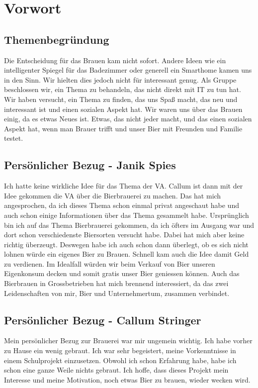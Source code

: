 \newpage
\section{Vorwort}
\subsection{Themenbegründung}
Die Entscheidung für das Brauen kam nicht sofort. Andere Ideen
 wie ein intelligenter Spiegel für das Badezimmer oder generell 
 ein Smarthome kamen uns in den Sinn. Wir hielten dies jedoch nicht
  für interessant genug. Als Gruppe beschlossen wir, ein Thema zu behandeln, das nicht direkt mit IT zu tun hat. Wir haben versucht, 
   ein Thema zu finden, das uns Spaß macht, das neu und interessant ist und einen sozialen Aspekt hat.
Wir waren uns über das Brauen einig,
 da es etwas Neues ist. Etwas, das nicht jeder macht, 
 und das einen sozialen Aspekt hat, wenn man Brauer trifft und unser Bier mit Freunden und Familie testet.
 \subsection{Persönlicher Bezug - Janik Spies}
 Ich hatte keine wirkliche Idee für das Thema der VA. Callum ist dann mit der Idee gekommen die VA über die Bierbrauerei zu machen. Das hat mich angesprochen, da ich dieses Thema schon einmal privat angeschaut habe und auch schon einige Informationen über das Thema gesammelt habe. Ursprünglich bin ich auf das Thema Bierbrauerei gekommen, da ich öfters im Ausgang war und dort schon verschiedenste Biersorten versucht habe. Dabei hat mich aber keine richtig überzeugt. Deswegen habe ich auch schon dann überlegt, ob es sich nicht lohnen würde ein eigenes Bier zu Brauen. Schnell kam auch die Idee damit Geld zu verdienen. Im Idealfall würden wir beim Verkauf von Bier unseren Eigenkonsum decken und somit gratis unser Bier geniessen können. Auch das Bierbrauen in Grossbetrieben hat mich brennend interessiert, 
 da das zwei Leidenschaften von mir, Bier und Unternehmertum, zusammen verbindet.
\subsection{Persönlicher Bezug - Callum Stringer}
Mein persönlicher Bezug zur Brauerei war mir ungemein wichtig. Ich habe vorher zu Hause ein wenig gebraut. 
Ich war sehr begeistert, meine Vorkenntnisse in einem Schulprojekt einzusetzen. Obwohl ich schon Erfahrung habe, habe ich schon eine ganze Weile nichts gebraut.
 Ich hoffe, dass dieses Projekt mein Interesse und meine Motivation, noch etwas Bier zu brauen, wieder wecken wird.
